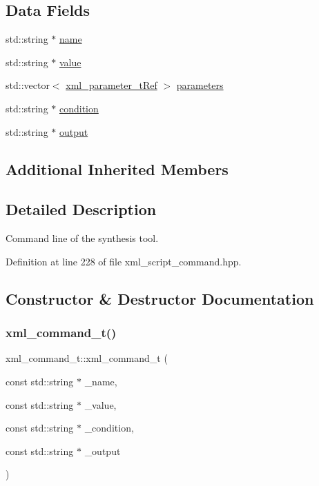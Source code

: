 \subsection*{Data Fields}
\begin{DoxyCompactItemize}
\item 
std\+::string $\ast$ \hyperlink{classxml__command__t_ac09e74dbd1ef3c41fcfaf3d19bbc8440}{name}
\item 
std\+::string $\ast$ \hyperlink{classxml__command__t_a75f61b7710a747e84711154c91966177}{value}
\item 
std\+::vector$<$ \hyperlink{xml__script__command_8hpp_aec6b63d2a298703bc3ead113609b27a6}{xml\+\_\+parameter\+\_\+t\+Ref} $>$ \hyperlink{classxml__command__t_ac03c6a34dd6173247c66d2fd03ea6208}{parameters}
\item 
std\+::string $\ast$ \hyperlink{classxml__command__t_a67299ab68dd3ee96452cf099cb5ddd69}{condition}
\item 
std\+::string $\ast$ \hyperlink{classxml__command__t_aae33cc58ac942bd16bfdd3b4a9e16b10}{output}
\end{DoxyCompactItemize}
\subsection*{Additional Inherited Members}


\subsection{Detailed Description}
Command line of the synthesis tool. 

Definition at line 228 of file xml\+\_\+script\+\_\+command.\+hpp.



\subsection{Constructor \& Destructor Documentation}
\mbox{\label{classxml__command__t_a32deca33f9e23706f5e59a54d3c3d4df}} 
\subsubsection{\texorpdfstring{xml\+\_\+command\+\_\+t()}{xml\_command\_t()}\hspace{0.1cm}{\footnotesize\ttfamily [1/2]}}
{\footnotesize\ttfamily xml\+\_\+command\+\_\+t\+::xml\+\_\+command\+\_\+t (\begin{DoxyParamCaption}\item[{const std\+::string $\ast$}]{\+\_\+name,  }\item[{const std\+::string $\ast$}]{\+\_\+value,  }\item[{const std\+::string $\ast$}]{\+\_\+condition,  }\item[{const std\+::string $\ast$}]{\+\_\+output }\end{DoxyParamCaption})}



